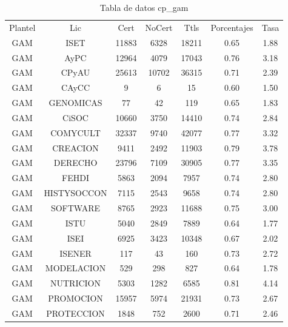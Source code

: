 \documentclass[12pt]{article}
\begin{document}
\begin{table}[h]
\centering
\begin{tabular}{ccccccc}

Plantel & Lic & Cert & NoCert & Ttls & Porcentajes & Tasa \\

GAM & ISET & 11883 & 6328 & 18211 & 0.65 & 1.88 \\
GAM & AyPC & 12964 & 4079 & 17043 & 0.76 & 3.18 \\
GAM & CPyAU & 25613 & 10702 & 36315 & 0.71 & 2.39 \\
GAM & CAyCC & 9 & 6 & 15 & 0.60 & 1.50 \\
GAM & GENOMICAS & 77 & 42 & 119 & 0.65 & 1.83 \\
GAM & CiSOC & 10660 & 3750 & 14410 & 0.74 & 2.84 \\
GAM & COMYCULT & 32337 & 9740 & 42077 & 0.77 & 3.32 \\
GAM & CREACION & 9411 & 2492 & 11903 & 0.79 & 3.78 \\
GAM & DERECHO & 23796 & 7109 & 30905 & 0.77 & 3.35 \\
GAM & FEHDI & 5863 & 2094 & 7957 & 0.74 & 2.80 \\
GAM & HISTYSOCCON & 7115 & 2543 & 9658 & 0.74 & 2.80 \\
GAM & SOFTWARE & 8765 & 2923 & 11688 & 0.75 & 3.00 \\
GAM & ISTU & 5040 & 2849 & 7889 & 0.64 & 1.77 \\
GAM & ISEI & 6925 & 3423 & 10348 & 0.67 & 2.02 \\
GAM & ISENER & 117 & 43 & 160 & 0.73 & 2.72 \\
GAM & MODELACION & 529 & 298 & 827 & 0.64 & 1.78 \\
GAM & NUTRICION & 5303 & 1282 & 6585 & 0.81 & 4.14 \\
GAM & PROMOCION & 15957 & 5974 & 21931 & 0.73 & 2.67 \\
GAM & PROTECCION & 1848 & 752 & 2600 & 0.71 & 2.46 \\

\end{tabular}
\caption{Tabla de datos cp\_gam}
\end{table}
\end{document}
